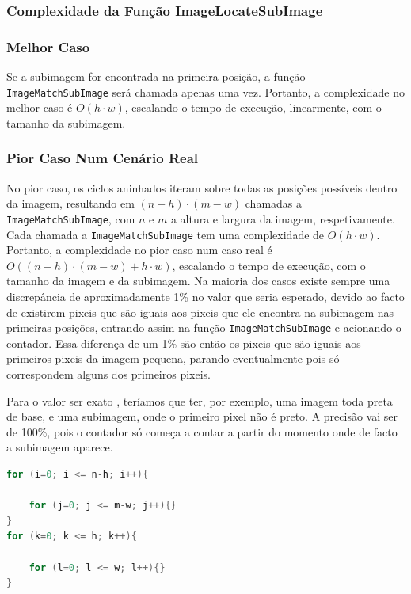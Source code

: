 \documentclass{report}
\begin{document}
\subsubsection{Complexidade da Função ImageLocateSubImage}

\subsubsection{Melhor Caso}
Se a subimagem for encontrada na primeira posição, a função \texttt{ImageMatchSubImage} será chamada apenas uma vez. 
Portanto, a complexidade no melhor caso é \(O(h \cdot w)\), escalando o tempo de execução, linearmente, com o tamanho da subimagem.

\subsubsection{Pior Caso Num Cenário Real}
No pior caso, os ciclos aninhados iteram sobre todas as posições possíveis dentro da imagem, 
resultando em \((n-h) \cdot (m-w)\) chamadas a \texttt{ImageMatchSubImage}, com \(n\) e \(m\) a altura e largura da imagem, respetivamente. 
Cada chamada a \texttt{ImageMatchSubImage} tem uma complexidade de \(O(h \cdot w)\).
Portanto, a complexidade no pior caso num caso real é \(O((n-h) \cdot (m-w) + h \cdot w)\), escalando o tempo de execução, 
com o tamanho da imagem e da subimagem. Na maioria dos casos existe sempre uma discrepância de aproximadamente 1\% no valor que seria esperado, devido ao facto de existirem pixeis que são iguais aos pixeis que ele encontra na subimagem nas primeiras posições, entrando assim na função \texttt{ImageMatchSubImage} e acionando o contador. Essa diferença de um 1\% são então os pixeis que são iguais aos primeiros pixeis da imagem pequena, parando eventualmente pois só correspondem alguns dos primeiros pixeis.

Para o valor ser exato , teríamos que ter, por exemplo, uma imagem toda preta de base, e uma subimagem, onde o primeiro pixel não é preto. A precisão vai ser de 100\%, pois o contador só começa a contar a partir do momento onde de facto a subimagem aparece.

\vspace{5mm}

\begingroup
\begin{lstlisting}[language=C]
for (i=0; i <= n-h; i++){
    
    for (j=0; j <= m-w; j++){}
}            
for (k=0; k <= h; k++){
            
    for (l=0; l <= w; l++){}
}
\end{lstlisting}
\endgroup
\end{document}
